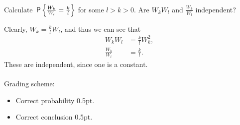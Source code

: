 \begin{exercise}[1]
Calculate $\P{\frac{W_k}{W_l}=\frac{k}{l}}$ for some $l>k>0$. Are $W_kW_l$ and $\frac{W_k}{W_l}$ independent?
\begin{solution}
Clearly, $W_k=\frac{k}{l}W_l$, and thus we can see that
\begin{align*}
    W_kW_l &= \frac kl W_k^2,\\
    \frac{W_k}{W_l} &= \frac kl.
\end{align*}
These are independent, since one is a constant.
\\\\
Grading scheme:
\begin{itemize}
    \item Correct probability 0.5pt.
    \item Correct conclusion 0.5pt.
\end{itemize}
\end{solution}
\end{exercise}



